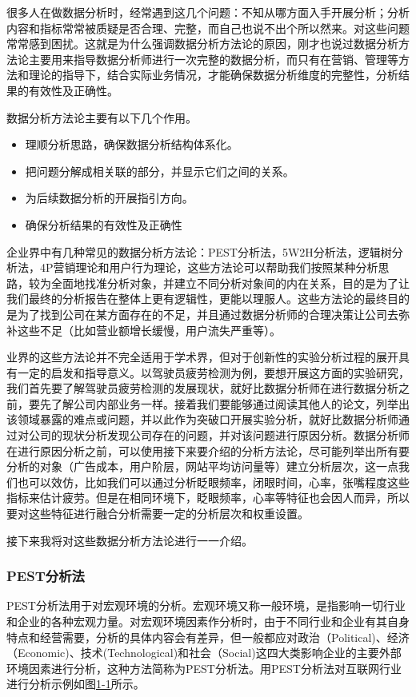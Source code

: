 很多人在做数据分析时，经常遇到这几个问题：不知从哪方面入手开展分析；分析内容和指标常常被质疑是否合理、完整，而自己也说不出个所以然来。对这些问题常常感到困扰。这就是为什么强调数据分析方法论的原因，刚才也说过数据分析方法论主要用来指导数据分析师进行一次完整的数据分析，而只有在营销、管理等方法和理论的指导下，结合实际业务情况，才能确保数据分析维度的完整性，分析结果的有效性及正确性。

数据分析方法论主要有以下几个作用。
\begin{itemize}
	\item 理顺分析思路，确保数据分析结构体系化。
    \item 把问题分解成相关联的部分，并显示它们之间的关系。
    \item 为后续数据分析的开展指引方向。
    \item 确保分析结果的有效性及正确性
\end{itemize}

企业界中有几种常见的数据分析方法论：PEST分析法，5W2H分析法，逻辑树分析法，4P营销理论和用户行为理论，这些方法论可以帮助我们按照某种分析思路，较为全面地找准分析对象，并建立不同分析对象间的内在关系，目的是为了让我们最终的分析报告在整体上更有逻辑性，更能以理服人。这些方法论的最终目的是为了找到公司在某方面存在的不足，并且通过数据分析师的合理决策让公司去弥补这些不足（比如营业额增长缓慢，用户流失严重等）。

业界的这些方法论并不完全适用于学术界，但对于创新性的实验分析过程的展开具有一定的启发和指导意义。以驾驶员疲劳检测为例，要想开展这方面的实验研究，我们首先要了解驾驶员疲劳检测的发展现状，就好比数据分析师在进行数据分析之前，要先了解公司内部业务一样。接着我们要能够通过阅读其他人的论文，列举出该领域暴露的难点或问题，并以此作为突破口开展实验分析，就好比数据分析师通过对公司的现状分析发现公司存在的问题，并对该问题进行原因分析。数据分析师在进行原因分析之前，可以使用接下来要介绍的分析方法论，尽可能列举出所有要分析的对象（广告成本，用户阶层，网站平均访问量等）建立分析层次，这一点我们也可以效仿，比如我们可以通过分析眨眼频率，闭眼时间，心率，张嘴程度这些指标来估计疲劳。但是在相同环境下，眨眼频率，心率等特征也会因人而异，所以要对这些特征进行融合分析需要一定的分析层次和权重设置。

接下来我将对这些数据分析方法论进行一一介绍。

\subsubsection{PEST分析法}

PEST分析法用于对宏观环境的分析。宏观环境又称一般环境，是指影响一切行业和企业的各种宏观力量。对宏观环境因素作分析时，由于不同行业和企业有其自身特点和经营需要，分析的具体内容会有差异，但一般都应对政治（Political)、经济（Economic)、技术(Technological)和社会（Social)这四大类影响企业的主要外部环境因素进行分析，这种方法简称为PEST分析法。用PEST分析法对互联网行业进行分析示例如图\href{fig:1-1}{1-1}所示。

